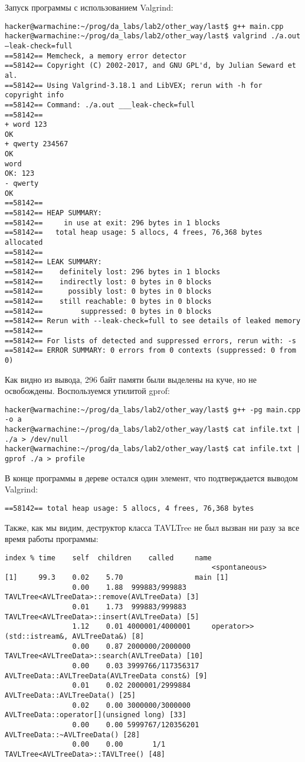 \documentclass[12pt]{article}
\begin{document}
Запуск программы с использованием Valgrind:
\begin{lstlisting}
hacker@warmachine:~/prog/da_labs/lab2/other_way/last$ g++ main.cpp
hacker@warmachine:~/prog/da_labs/lab2/other_way/last$ valgrind ./a.out –leak-check=full
==58142== Memcheck, a memory error detector
==58142== Copyright (C) 2002-2017, and GNU GPL'd, by Julian Seward et al.
==58142== Using Valgrind-3.18.1 and LibVEX; rerun with -h for copyright info
==58142== Command: ./a.out ___leak-check=full
==58142==
+ word 123
OK
+ qwerty 234567
OK
word
OK: 123
- qwerty
OK
==58142==
==58142== HEAP SUMMARY:
==58142==     in use at exit: 296 bytes in 1 blocks
==58142==   total heap usage: 5 allocs, 4 frees, 76,368 bytes allocated
==58142==
==58142== LEAK SUMMARY:
==58142==    definitely lost: 296 bytes in 1 blocks
==58142==    indirectly lost: 0 bytes in 0 blocks
==58142==      possibly lost: 0 bytes in 0 blocks
==58142==    still reachable: 0 bytes in 0 blocks
==58142==         suppressed: 0 bytes in 0 blocks
==58142== Rerun with --leak-check=full to see details of leaked memory
==58142==
==58142== For lists of detected and suppressed errors, rerun with: -s
==58142== ERROR SUMMARY: 0 errors from 0 contexts (suppressed: 0 from 0)
\end{lstlisting}
Как видно из вывода, 296 байт памяти были выделены на куче, но не освобождены. 
Воспользуемся утилитой gprof:
\begin{lstlisting}
hacker@warmachine:~/prog/da_labs/lab2/other_way/last$ g++ -pg main.cpp -o a
hacker@warmachine:~/prog/da_labs/lab2/other_way/last$ cat infile.txt | ./a > /dev/null
hacker@warmachine:~/prog/da_labs/lab2/other_way/last$ cat infile.txt | gprof ./a > profile
\end{lstlisting}
В конце программы в дереве остался один элемент, что подтверждается выводом Valgrind:
\begin{lstlisting}
==58142== total heap usage: 5 allocs, 4 frees, 76,368 bytes \end{lstlisting}

Также, как мы видим, деструктор класса TAVLTree не был вызван ни разу за все время работы программы:
\begin{lstlisting}
index % time    self  children    called     name
                                                 <spontaneous>
[1]     99.3    0.02    5.70                 main [1]
                0.00    1.88  999883/999883      TAVLTree<AVLTreeData>::remove(AVLTreeData) [3]
                0.01    1.73  999883/999883      TAVLTree<AVLTreeData>::insert(AVLTreeData) [5]
                1.12    0.01 4000001/4000001     operator>>(std::istream&, AVLTreeData&) [8]
                0.00    0.87 2000000/2000000     TAVLTree<AVLTreeData>::search(AVLTreeData) [10]
                0.00    0.03 3999766/117356317     AVLTreeData::AVLTreeData(AVLTreeData const&) [9]
                0.01    0.02 2000001/2999884     AVLTreeData::AVLTreeData() [25]
                0.02    0.00 3000000/3000000     AVLTreeData::operator[](unsigned long) [33]
                0.00    0.00 5999767/120356201     AVLTreeData::~AVLTreeData() [28]
                0.00    0.00       1/1           TAVLTree<AVLTreeData>::TAVLTree() [48]
\end{lstlisting}
\end{document}
